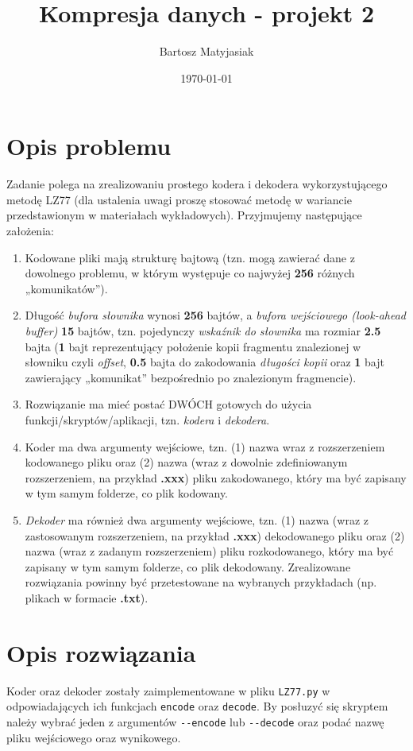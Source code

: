 \documentclass[12pt]{article}
\title{Kompresja danych - projekt 2}
\date{\today}
\author{Bartosz Matyjasiak}
\def\code#1{\texttt{#1}}
\begin{document}
\maketitle
\tableofcontents
\pagebreak

\section{Opis problemu}
Zadanie polega na zrealizowaniu prostego kodera i dekodera wykorzystującego metodę LZ77
(dla ustalenia uwagi proszę stosować metodę w wariancie przedstawionym w materiałach
wykładowych).
Przyjmujemy następujące założenia:
\begin{enumerate}
\item Kodowane pliki mają strukturę bajtową (tzn. mogą zawierać dane z dowolnego
problemu, w którym występuje co najwyżej \textbf{256} różnych „komunikatów”).
\item Długość \textit{bufora słownika} wynosi \textbf{256} bajtów, a \textit{bufora wejściowego (look-ahead buffer)}
\textbf{15} bajtów, tzn. pojedynczy \textit{wskaźnik do słownika} ma rozmiar \textbf{2.5} bajta (\textbf{1} bajt
reprezentujący położenie kopii fragmentu znalezionej w słowniku czyli \textit{offset}, \textbf{0.5} bajta
do zakodowania \textit{długości kopii} oraz \textbf{1} bajt zawierający „komunikat” bezpośrednio po
znalezionym fragmencie).
\item Rozwiązanie ma mieć postać DWÓCH gotowych do użycia \\ funkcji/skryptów/aplikacji,
tzn. \textit{kodera} i \textit{dekodera}.
\item Koder ma dwa argumenty wejściowe, tzn. (1) nazwa wraz z rozszerzeniem
kodowanego pliku oraz (2) nazwa (wraz z dowolnie zdefiniowanym rozszerzeniem, na
przykład \textbf{.xxx}) pliku zakodowanego, który ma być zapisany w tym samym folderze,
co plik kodowany.
\item \textit{Dekoder} ma również dwa argumenty wejściowe, tzn. (1) nazwa (wraz z zastosowanym
rozszerzeniem, na przykład \textbf{.xxx}) dekodowanego pliku oraz (2) nazwa (wraz z
zadanym rozszerzeniem) pliku rozkodowanego, który ma być zapisany w tym samym
folderze, co plik dekodowany.
Zrealizowane rozwiązania powinny być przetestowane na wybranych przykładach (np. plikach
w formacie \textbf{.txt}).
\end{enumerate}
\newpage
\section{Opis rozwiązania}
Koder oraz dekoder zostały zaimplementowane w pliku \code{LZ77.py} w odpowiadających ich funkcjach \code{encode} oraz \code{decode}.
By posłuzyć się skryptem należy wybrać jeden z argumentów \code{-\--encode} lub \code{-\--decode} oraz podać nazwę pliku wejściowego oraz wynikowego.
\end{document}

